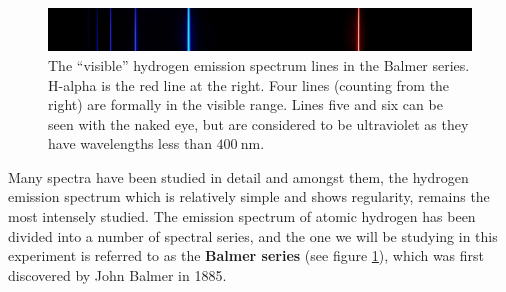 \documentclass[%
 reprint,
 amsmath,amssymb,
 aps,
]{revtex4-2}
\begin{document}
    \par
    \begin{figure}
        \centering
        \includegraphics[scale = 0.5]{Figures/900px-Visible_spectrum_of_hydrogen.jpg}
        \caption{The ``visible'' hydrogen emission spectrum lines in the Balmer series. H-alpha is the red line at the right. Four lines (counting from the right) are formally in the visible range. Lines five and six can be seen with the naked eye, but are considered to be ultraviolet as they have wavelengths less than $\SI{400}{\nano \metre}$.}
        \label{fig:balmer}
    \end{figure}
    Many spectra have been studied in detail and amongst them, the hydrogen emission spectrum which is relatively simple and shows regularity, remains the most intensely studied. The emission spectrum of atomic hydrogen has been divided into a number of spectral series, and the one we will be studying in this experiment is referred to as the \textbf{Balmer series} (see figure \ref{fig:balmer}), which was first discovered by John Balmer in 1885.
    
    
\end{document}
